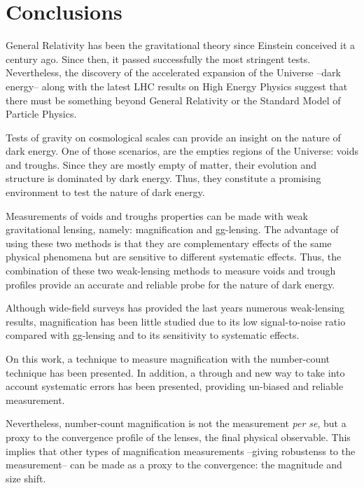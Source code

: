 
\chapter{Conclusions}
\label{ch:conclusions}
General Relativity has been the gravitational theory since Einstein conceived it a century ago. Since then, it passed successfully the most stringent tests. Nevertheless, the discovery of the accelerated expansion of the Universe --dark energy-- along with the latest LHC results on High Energy Physics suggest that there must be something beyond General Relativity or the Standard Model of Particle Physics.
\newline

Tests of gravity on cosmological scales can provide an insight on the nature of dark energy. One of those scenarios, are the empties regions of the Universe: voids and troughs. Since they are mostly empty of matter, their evolution and structure is dominated by dark energy. Thus, they constitute a promising environment to test the nature of dark energy.
\newline

Measurements of voids and troughs properties can be made with weak gravitational lensing, namely: magnification and gg-lensing. The advantage of using these two methods is that they are complementary effects of the same physical phenomena but are sensitive to different systematic effects. Thus, the combination of these two weak-lensing methods to measure voids and trough profiles provide an accurate and reliable probe for the nature of dark energy.
\newline

Although wide-field surveys has provided the last years numerous weak-lensing results, magnification has been little studied due to its low signal-to-noise ratio compared with gg-lensing and to its sensitivity to systematic effects.
\newline

On this work, a technique to measure magnification with the number-count technique has been presented. In addition, a through and new way to take into account systematic errors has been presented, providing un-biased and reliable measurement.
\newline

Nevertheless, number-count magnification is not the measurement {\it per se}, but a proxy to the convergence profile of the lenses, the final physical observable. This implies that other types of magnification measurements --giving robustenss to the measurement-- can be made as a proxy to the convergence: the magnitude and size shift.
\newline

